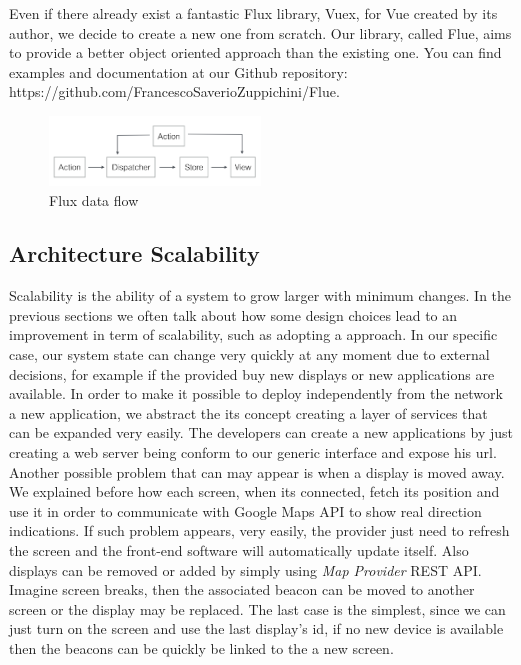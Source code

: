 \documentclass[]{usiinfbachelorproject}
\begin{document}
Even if there already exist a fantastic Flux library, Vuex, for Vue created by its author, we decide to create a new one from scratch. Our library, called Flue, aims to provide a better object oriented approach than the existing one. You can find examples and documentation at our Github repository: https://github.com/FrancescoSaverioZuppichini/Flue.

\begin{figure}[H]
  \centering
  \includegraphics[width=0.5\textwidth]{./images/flux_data_flow.png}
  \caption{Flux data flow}
\end{figure} 
\subsection{Architecture Scalability}
Scalability is the ability of a system to grow larger with minimum changes. In the previous sections we often talk about how some design choices lead to an improvement in term of scalability, such as adopting a  approach. In our specific case, our system state can change very quickly at any moment due to external decisions, for example if the provided buy new displays or new applications are available.
In order to make it possible to deploy independently from the network a new application, we abstract the its concept creating a layer of services that can be expanded very easily. The developers can create a new applications by just creating a web server being conform to our generic interface and expose his url.
Another possible problem that can may appear is when a display is moved away. We explained before how each screen, when its connected, fetch its position and use it in order to communicate with Google Maps API to show real direction indications. If such problem appears, very easily, the provider just need to refresh the screen and the front-end software will automatically update itself.
Also displays can be removed or added by simply using \emph{Map Provider} REST API. Imagine screen breaks, then the associated beacon can be moved to another screen or the display may be replaced. The last case is the simplest, since we can just turn on the screen and use the last display's id, if no new device is available then the beacons can be quickly be linked to the a new screen.
\end{document}
